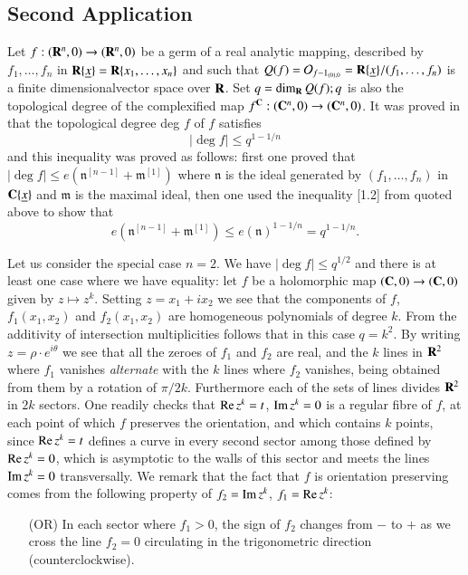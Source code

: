\subsection{Second Application}\label{art06-subsec3.2}
Let $f: (\mathbf{R}^n, 0) \to (\mathbf{R}^n, 0)$ be a germ of a real analytic mapping, described by $f_1 , \ldots, f_n$ in $\mathbf{R} \{\underline{x}\} = \mathbf{R}\{ x_1,\ldots, x_n\}$ and such that $Q (f) = \mathcal{O}_{f-1_{(0),0}} = \mathbf{R} \{\underline{x}\}/(f_1, \ldots, f_n)$ is  a finite dimensional\pageoriginale vector space over $\mathbf{R}$. Set $q =\dim_{\mathbf{R}} Q (f); q$ is also the topological degree of the complexified map $f^{\mathbf{C}}: (\mathbf{C}^n, 0) \to (\mathbf{C}^n,0)$. It was proved in \cite{art06-keyE.L.} that the topological degree deg $f$ of $f$ satisfies
$$
|\deg f| \leqslant q^{1-1/n}
$$
and this inequality was proved as follows: first one proved that $|\deg f| \leqslant e(\mathfrak{n}^{[n-1]} + \mathfrak{m}^{[1]})$ where $\mathfrak{n}$ is the ideal generated by $(f_1, \ldots, f_n)$ in $\mathbf{C} \{\underline{x}\}$ and $\mathfrak{m}$ is the maximal ideal, then one used the inequality [1.2] from \cite{art06-keyM.I.} quoted above to show that 
$$
e (\mathfrak{n}^{[n-1]} + \mathfrak{m}^{[1]}) \leqslant e (\mathfrak{n})^{1-1/n} = q^{1-1/n}.
$$

Let us consider the special case $n =2$. We have $|\deg f| \leqslant q^{1/2}$ and there is at least one case where we have equality: let $f$ be a holomorphic map $(\mathbf{C}, 0) \to (\mathbf{C}, 0)$ given by $z \mapsto z^k$. Setting $z = x_1 + ix_2$ we see that the components of $f$, $f_1 (x_1, x_2)$ and $f_2(x_1, x_2)$ are homogeneous  polynomials of degree $k$. From the additivity of intersection multiplicities follows that in this case $q = k^2$. By writing $z = \rho \cdot e^{i\theta}$ we see that all the zeroes of $f_1$ and $f_2$ are real, and the $k$ lines in $\mathbf{R}^2$ where $f_1$ vanishes {\em alternate} with the $k$ lines where $f_2$ vanishes, being obtained from them by a rotation of $\pi/2k$. Furthermore each of the sets of lines divides $\mathbf{R}^2$ in $2k$ sectors. One readily checks that $\operatorname{Re} z^k =t$, $\operatorname{Im} z^k=0$ is a regular fibre of $f$, at each point of which $f$ preserves the orientation, and which contains $k$ points, since $\operatorname{Re} z^k =t$ defines a curve in every second sector among those defined by $\operatorname{Re} z^k =0$, which is asymptotic to the walls of this sector and meets the lines $\operatorname{Im} z^k =0$ transversally. We  remark that the fact that $f$ is orientation preserving comes from the following property of $f_2 = \operatorname{Im} z^k$, $f_1 = \operatorname{Re} z^k$:
\begin{itemize}
\item[(OR)] In each sector where $f_1 > 0$, the sign of $f_2$ changes  from $-$ to $+$ as we cross the line $f_2=0$ circulating in the trigonometric direction (counterclockwise).
\end{itemize}

